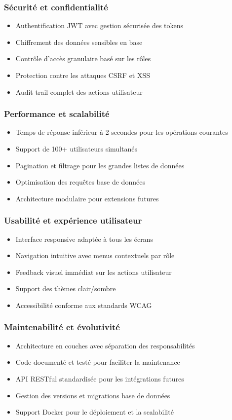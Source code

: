 \documentclass[12pt,a4paper]{report}
\begin{document}
\subsubsection{Sécurité et confidentialité}
\begin{itemize}
\item Authentification JWT avec gestion sécurisée des tokens
\item Chiffrement des données sensibles en base
\item Contrôle d'accès granulaire basé sur les rôles
\item Protection contre les attaques CSRF et XSS

\item Audit trail complet des actions utilisateur
\end{itemize}

\subsubsection{Performance et scalabilité}
\begin{itemize}
\item Temps de réponse inférieur à 2 secondes pour les opérations courantes
\item Support de 100+ utilisateurs simultanés
\item Pagination et filtrage pour les grandes listes de données
\item Optimisation des requêtes base de données
\item Architecture modulaire pour extensions futures
\end{itemize}

\subsubsection{Usabilité et expérience utilisateur}
\begin{itemize}
\item Interface responsive adaptée à tous les écrans
\item Navigation intuitive avec menus contextuels par rôle
\item Feedback visuel immédiat sur les actions utilisateur
\item Support des thèmes clair/sombre
\item Accessibilité conforme aux standards WCAG
\end{itemize}

\subsubsection{Maintenabilité et évolutivité}
\begin{itemize}
\item Architecture en couches avec séparation des responsabilités
\item Code documenté et testé pour faciliter la maintenance
\item API RESTful standardisée pour les intégrations futures
\item Gestion des versions et migrations base de données
\item Support Docker pour le déploiement et la scalabilité
\end{itemize}
\end{document}
